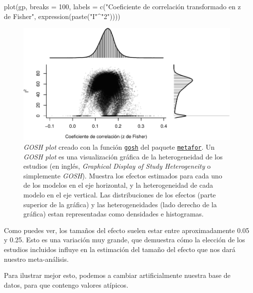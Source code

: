 \documentclass[
  bookmarksnumbered]{article}
\newenvironment{Shaded}{\begin{snugshade}}{\end{snugshade}}
\newcommand{\AttributeTok}[1]{\textcolor[rgb]{0.00,0.34,0.68}{#1}}
\newcommand{\DecValTok}[1]{\textcolor[rgb]{0.69,0.50,0.00}{#1}}
\newcommand{\FunctionTok}[1]{\textcolor[rgb]{0.39,0.29,0.61}{#1}}
\newcommand{\NormalTok}[1]{\textcolor[rgb]{0.12,0.11,0.11}{#1}}
\newcommand{\SpecialCharTok}[1]{\textcolor[rgb]{0.24,0.68,0.91}{#1}}
\newcommand{\StringTok}[1]{\textcolor[rgb]{0.75,0.01,0.01}{#1}}
\begin{document}
\begin{Shaded}
\begin{Highlighting}[]
\FunctionTok{plot}\NormalTok{(gp, }
     \AttributeTok{breaks =} \DecValTok{100}\NormalTok{,}
     \AttributeTok{labels =} \FunctionTok{c}\NormalTok{(}\StringTok{"Coeficiente de correlación transformado en z de Fisher"}\NormalTok{, }
                \FunctionTok{expression}\NormalTok{(}\FunctionTok{paste}\NormalTok{(}\StringTok{"I"}\SpecialCharTok{\^{}}\StringTok{"2"}\NormalTok{))))}
\end{Highlighting}
\end{Shaded}

\begin{figure}
\centering
\includegraphics{Meta-analysis_files/figure-latex/gosh1-1.pdf}
\caption{\label{fig:gosh1}\emph{GOSH plot} creado con la función \href{https://www.metafor-project.org/doku.php/plots:gosh_plot}{\texttt{gosh}} del paquete \href{https://www.metafor-project.org/doku.php}{\texttt{metafor}}. Un \emph{GOSH plot} es una visualización gráfica de la heterogeneidad de los estudios (en inglés, \emph{Graphical Display of Study Heterogeneity} o simplemente \emph{GOSH}). Muestra los efectos estimados para cada uno de los modelos en el eje horizontal, y la heterogeneidad de cada modelo en el eje vertical. Las distribuciones de los efectos (parte superior de la gráfica) y las heterogeneidades (lado derecho de la gráfica) estan representadas como densidades e histogramas.}
\end{figure}

Como puedes ver, los tamaños del efecto suelen estar entre aproximadamente 0.05 y 0.25. Esto es una variación muy grande, que demuestra cómo la elección de los estudios incluidos influye en la estimación del tamaño del efecto que nos dará nuestro meta-análisis.

Para ilustrar mejor esto, podemos a cambiar artificialmente nuestra base de datos, para que contengo valores atípicos.
\end{document}
